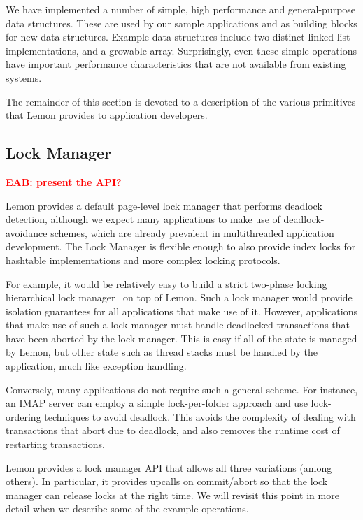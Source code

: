\documentclass[letterpaper,twocolumn,english]{article}
\newcommand{\yad}{Lemon\xspace}
\newcommand{\eab}[1]{\textcolor{red}{\bf EAB: #1}}
\begin{document}
We have implemented a number of simple, high performance
and general-purpose data structures.  These are used by our sample
applications and as building blocks for new data structures.  Example
data structures include two distinct linked-list implementations, and
a growable array.  Surprisingly, even these simple operations have
important performance characteristics that are not available from
existing systems. 

The remainder of this section is devoted to a description of the
various primitives that \yad provides to application developers.

\subsection{Lock Manager}
\label{lock-manager}
\eab{present the API?}

 \yad provides a default page-level lock manager that performs deadlock
detection, although we expect many applications to make use of
deadlock-avoidance schemes, which are already prevalent in
multithreaded application development.  The Lock Manager is flexible
enough to also provide index locks for hashtable implementations and 
more complex locking protocols.

For example, it would be relatively easy to build a strict two-phase
locking hierarchical lock
manager~\cite{hierarcicalLocking,hierarchicalLockingOnAriesExample} on
top of \yad.  Such a lock manager would provide isolation guarantees
for all applications that make use of it.  However, applications that
make use of such a lock manager must handle deadlocked transactions
that have been aborted by the lock manager.  This is easy if all of
the state is managed by \yad, but other state such as thread stacks
must be handled by the application, much like exception handling.

Conversely, many applications do not require such a general scheme.
For instance, an IMAP server can employ a simple lock-per-folder
approach and use lock-ordering techniques to avoid deadlock.  This
avoids the complexity of dealing with transactions that abort due
to deadlock, and also removes the runtime cost of restarting 
transactions.

\yad provides a lock manager API that allows all three variations
(among others). In particular, it provides upcalls on commit/abort so
that the lock manager can release locks at the right time. We will
revisit this point in more detail when we describe some of the example
operations.
\end{document}
